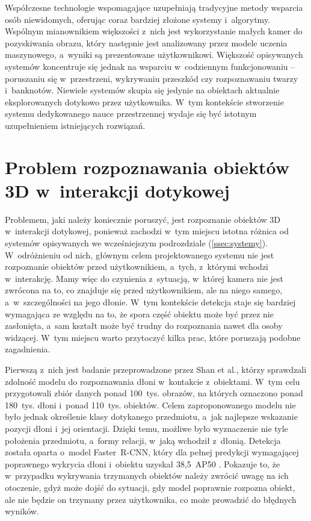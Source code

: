 Współczesne technologie wspomagające uzupełniają tradycyjne metody wsparcia osób niewidomych, oferując coraz bardziej złożone systemy i~algorytmy. Wspólnym mianownikiem większości z~nich jest wykorzystanie małych kamer do pozyskiwania obrazu, który następnie jest analizowany przez modele uczenia maszynowego, a~wyniki są prezentowane użytkownikowi. Większość opisywanych systemów koncentruje się jednak na wsparciu w~codziennym funkcjonowaniu -- poruszaniu się w~przestrzeni, wykrywaniu przeszkód czy rozpoznawaniu twarzy i~banknotów. Niewiele systemów skupia się jedynie na obiektach aktualnie eksplorowanych dotykowo przez użytkownika. W~tym kontekście stworzenie systemu dedykowanego nauce przestrzennej wydaje się być istotnym uzupełnieniem istniejących rozwiązań.

\section{Problem rozpoznawania obiektów 3D w~interakcji dotykowej}

Problemem, jaki należy koniecznie poruszyć, jest rozpoznanie obiektów 3D w~interakcji dotykowej, ponieważ zachodzi w~tym miejscu istotna różnica od systemów opisywanych we wcześniejszym podrozdziale (\ref{ssec:systemy}). W~odróżnieniu od nich, głównym celem projektowanego systemu nie jest rozpoznanie obiektów przed użytkownikiem, a~tych, z~którymi wchodzi w~interakcję. Mamy więc do czynienia z~sytuacją, w~której kamera nie jest zwrócona na to, co znajduje się przed użytkownikiem, ale na niego samego, a~w~szczególności na jego dłonie. W~tym kontekście detekcja staje się bardziej wymagająca ze względu na to, że spora część obiektu może być przez nie zasłonięta, a~sam kształt może być trudny do rozpoznania nawet dla osoby widzącej. W~tym miejscu warto przytoczyć kilka prac, które poruszają podobne zagadnienia.

Pierwszą z~nich jest badanie przeprowadzone przez Shan et al., którzy sprawdzali zdolność modelu do rozpoznawania dłoni w~kontakcie z~obiektami. W~tym celu przygotowali zbiór danych ponad 100~tys. obrazów, na których oznaczono ponad 180~tys. dłoni i~ponad 110~tys. obiektów. Celem zaproponowanego modelu nie było jednak określenie klasy dotykanego przedmiotu, a~jak najlepsze wskazanie pozycji dłoni i~jej orientacji. Dzięki temu, możliwe było wyznaczenie nie tyle położenia przedmiotu, a~formy relacji, w~jaką wchodził z~dłonią. Detekcja została oparta o~model Faster~R-CNN, który dla pełnej predykcji wymagającej poprawnego wykrycia dłoni i~obiektu uzyskał 38,5\ AP\@50 \cite{bib:Shan_2020_CVPR}.
Pokazuje to, że w~przypadku wykrywania trzymanych obiektów należy zwrócić uwagę na ich otoczenie, gdyż może dojść do sytuacji, gdy model poprawnie rozpozna obiekt, ale nie będzie on trzymany przez użytkownika, co może prowadzić do błędnych wyników.

